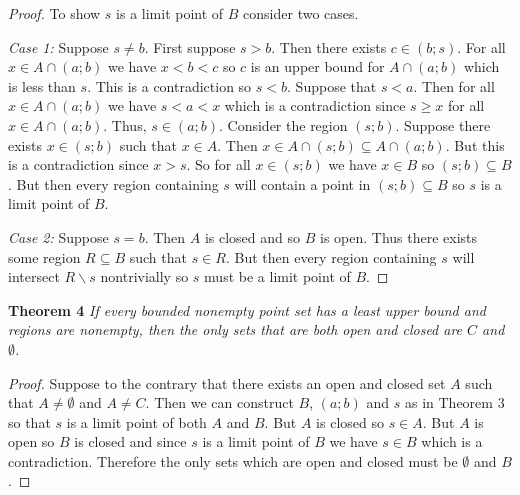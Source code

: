 \documentclass{article}
\begin{document}
\begin{flushleft}
\begin{proof}
To show $s$ is a limit point of $B$ consider two cases.\newline

\textit{Case 1:} Suppose $s \neq b$. First suppose $s>b$. Then there exists $c \in (b;s)$. For all $x \in A \cap (a;b)$ we have $x < b < c$ so $c$ is an upper bound for $A \cap (a;b)$ which is less than $s$. This is a contradiction so $s<b$. Suppose that $s<a$. Then for all $x \in A \cap (a;b)$ we have $s<a<x$ which is a contradiction since $s \geq x$ for all $x \in A \cap (a;b)$. Thus, $s \in (a;b)$. Consider the region $(s;b)$. Suppose there exists $x \in (s;b)$ such that $x \in A$. Then $x \in A \cap (s;b) \subseteq A \cap (a;b)$. But this is a contradiction since $x > s$. So for all $x \in (s;b)$ we have $x \in B$ so $(s;b) \subseteq B$. But then every region containing $s$ will contain a point in $(s;b) \subseteq B$ so $s$ is a limit point of $B$.\newline

\textit{Case 2:} Suppose $s=b$. Then $A$ is closed and so $B$ is open. Thus there exists some region $R \subseteq B$ such that $s \in R$. But then every region containing $s$ will intersect $R \backslash s$ nontrivially so $s$ must be a limit point of  $B$.
\end{proof}

\textbf{Theorem 4}
\textsl{If every bounded nonempty point set has a least upper bound and regions are nonempty, then the only sets that are both open and closed are $C$ and $\emptyset$.}
\begin{proof}
Suppose to the contrary that there exists an open and closed set $A$ such that $A \neq \emptyset$ and $A \neq C$. Then we can construct $B$, $(a;b)$ and $s$ as in Theorem 3 so that $s$ is a limit point of both $A$ and $B$. But $A$ is closed so $s \in A$. But $A$ is open so $B$ is closed and since $s$ is a limit point of $B$ we have $s \in B$ which is a contradiction. Therefore the only sets which are open and closed must be $\emptyset$ and $B$.
\end{proof}

\end{flushleft}
\end{document}
